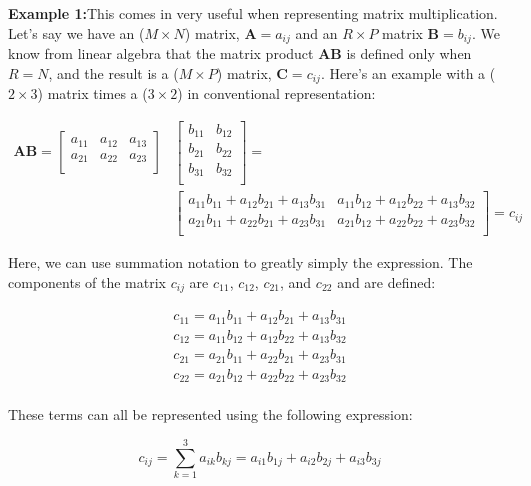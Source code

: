\begin{displayquote}
	\textbf{Example 1:}This comes in very useful when representing matrix multiplication. Let's say we have an ($M \times N$) matrix, $\mathbf{A} = a_{ij}$ and an $R \times P$ matrix $\mathbf{B} = b_{ij}$. We know from linear algebra that the matrix product $\mathbf{AB}$ is defined only when $R = N$, and the result is a ($M \times P$) matrix, $\mathbf{C} = c_{ij}$. Here's an example with a ($2 \times 3$) matrix times a ($3 \times 2$) in conventional representation:

\begin{align*}
\mathbf{AB} =
	\begin{bmatrix}
		a_{11} & a_{12} & a_{13}\\
		a_{21} & a_{22} & a_{23}\\
	\end{bmatrix}
	&\begin{bmatrix}
		b_{11} & b_{12}\\
		b_{21} & b_{22}\\
		b_{31} & b_{32}\\
	\end{bmatrix}
	= \\
	&\begin{bmatrix}
		a_{11}b_{11} + a_{12}b_{21} + a_{13}b_{31} & a_{11}b_{12} + a_{12}b_{22} + a_{13}b_{32}\\
		a_{21}b_{11} + a_{22}b_{21} + a_{23}b_{31} & a_{21}b_{12} + a_{22}b_{22} + a_{23}b_{32}\\
	\end{bmatrix}
	=c_{ij}
\end{align*}

Here, we can use summation notation to greatly simply the expression. The components of the matrix $c_{ij}$ are $c_{11}$, $c_{12}$, $c_{21}$, and $c_{22}$ and are defined:

\begin{align*}
	c_{11} = a_{11}b_{11} + a_{12}b_{21} + a_{13}b_{31}\\
	c_{12} = a_{11}b_{12} + a_{12}b_{22} + a_{13}b_{32}\\
	c_{21} = a_{21}b_{11} + a_{22}b_{21} + a_{23}b_{31}\\
	c_{22} = a_{21}b_{12} + a_{22}b_{22} + a_{23}b_{32}\\
\end{align*} 

These terms can all be represented using the following expression:

\begin{equation}
	c_{ij} = \sum_{k=1}^{3} a_{ik}b_{kj} = a_{i1}b_{1j} + a_{i2}b_{2j} + a_{i3}b_{3j}
\end{equation}


\end{displayquote}
